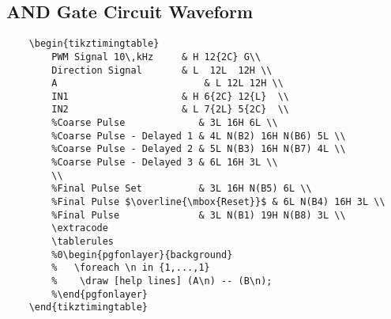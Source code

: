 \subsection{AND Gate Circuit Waveform}
\begin{verbatim}
	\begin{tikztimingtable}
		PWM Signal 10\,kHz	   & H 12{2C} G\\
		Direction Signal  	   & L  12L  12H \\
		A						   & L 12L 12H \\
		IN1				   	   & H 6{2C} 12{L}  \\
		IN2			   		   & L 7{2L} 5{2C}  \\
		%Coarse Pulse             & 3L 16H 6L \\
		%Coarse Pulse - Delayed 1 & 4L N(B2) 16H N(B6) 5L \\
		%Coarse Pulse - Delayed 2 & 5L N(B3) 16H N(B7) 4L \\
		%Coarse Pulse - Delayed 3 & 6L 16H 3L \\
		\\
		%Final Pulse Set          & 3L 16H N(B5) 6L \\
		%Final Pulse $\overline{\mbox{Reset}}$ & 6L N(B4) 16H 3L \\
		%Final Pulse              & 3L N(B1) 19H N(B8) 3L \\
		\extracode
		\tablerules
		%0\begin{pgfonlayer}{background}
		%   \foreach \n in {1,...,1}
		%    \draw [help lines] (A\n) -- (B\n);
		%\end{pgfonlayer}
	\end{tikztimingtable}
\end{verbatim}

